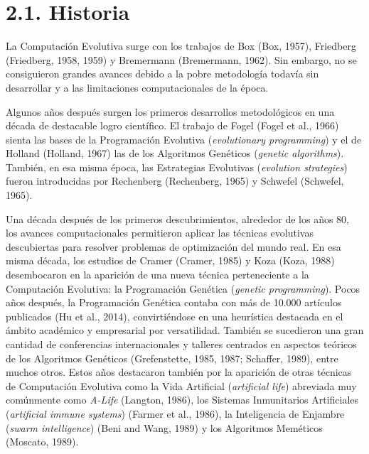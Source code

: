 \documentclass[spanish,a4paper,12pt,twoside]{report}
\begin{document}
  \section*{\Large 2.1. Historia}
  La Computación Evolutiva surge con los trabajos de Box (Box, 1957),  Friedberg (Friedberg, 1958, 1959) y Bremermann (Bremermann, 1962). Sin embargo, no se consiguieron grandes avances debido a la pobre metodología todavía sin desarrollar y a las limitaciones computacionales de la época. \par
  Algunos años después surgen los primeros desarrollos metodológicos en una década de destacable logro científico. El trabajo de Fogel (Fogel et al., 1966) sienta las bases de la Programación Evolutiva (\emph{evolutionary programming}) y el de Holland (Holland, 1967) las de los Algoritmos Genéticos (\emph{genetic algorithms}). También, en esa misma época, las Estrategias Evolutivas (\emph{evolution strategies}) fueron introducidas por Rechenberg (Rechenberg, 1965) y Schwefel (Schwefel, 1965). \par
  Una década después de los primeros descubrimientos, alrededor de los años 80, los avances computacionales permitieron aplicar las técnicas evolutivas descubiertas para resolver problemas de optimización del mundo real. En esa misma década, los estudios de Cramer (Cramer, 1985) y Koza (Koza, 1988) desembocaron en la aparición de una nueva técnica perteneciente a la Computación Evolutiva: la Programación Genética (\emph{genetic programming}). Pocos años después, la Programación Genética contaba con más de 10.000 artículos publicados (Hu et al., 2014), convirtiéndose en una heurística destacada en el ámbito académico y empresarial por versatilidad. También se sucedieron una gran cantidad de conferencias internacionales y talleres centrados en aspectos teóricos de los Algoritmos Genéticos (Grefenstette, 1985, 1987; Schaffer, 1989), entre muchos otros. Estos años destacaron también por la aparición de otras técnicas de Computación Evolutiva como la Vida Artificial (\emph{artificial life}) abreviada muy comúnmente como \emph{A-Life} (Langton, 1986), los Sistemas Inmunitarios Artificiales (\emph{artificial immune systems}) (Farmer et al., 1986), la Inteligencia de Enjambre (\emph{swarm intelligence}) (Beni and Wang, 1989) y los Algoritmos Meméticos (Moscato, 1989). \par
\end{document}
